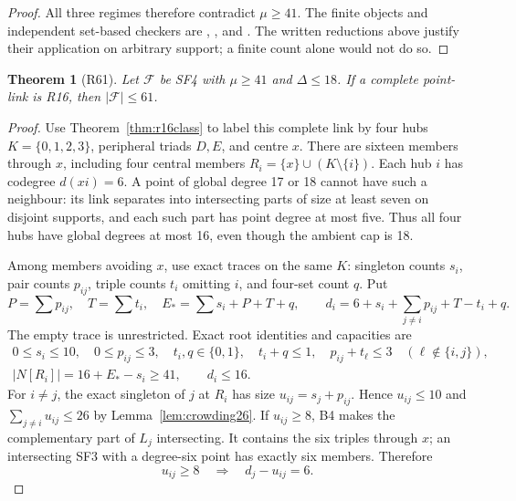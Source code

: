 \documentclass[11pt,a4paper]{article}
\numberwithin{equation}{section}
\newtheorem{theorem}{Theorem}[section]
\theoremstyle{remark}
\newcommand{\F}{\mathcal F}
\begin{document}
\begin{proof}
All three regimes therefore contradict $\mu\ge 41$. The finite
objects and independent set-based checkers are
,
,
 and
. The written reductions above
justify their application on arbitrary support; a finite count alone
would not do so.
\end{proof}

\begin{theorem}[R61]\label{thm:r61}
Let $\F $ be SF4 with $\mu\ge 41$ and $\Delta\le 18$. If a complete
point-link is R16, then $|\F|\le 61$.
\end{theorem}
\begin{proof}
Use Theorem~\ref{thm:r16class} to label this complete link by four hubs
$ K=\{0,1,2,3\}$, peripheral triads $ D,E $, and centre $ x $.
There are sixteen members through $ x $, including four central members
$ R_i=\{x\}\cup(K\setminus\{i\})$.
Each hub $ i $ has codegree $ d(xi)=6$. A point of global degree 17 or 18
cannot have such a neighbour: its link separates into intersecting
parts of size at least seven on disjoint supports, and each such
part has point degree at most five. Thus all four hubs have global
degrees at most 16, even though the ambient cap is 18.

Among members avoiding $ x $, use exact traces on the same $ K $: singleton
counts $ s_i $, pair counts $ p_{ij}$, triple counts $ t_i $ omitting $ i $, and
four-set count $ q $. Put
\[
 P=\sum p_{ij},\quad T=\sum t_i,\quad E_*=\sum s_i+P+T+q,
 \qquad d_i=6+s_i+\sum_{j\ne i}p_{ij}+T-t_i+q.
\]
The empty trace is unrestricted. Exact root identities and capacities
are
\begin{gather*}
 0\le s_i\le 10,\quad 0\le p_{ij}\le 3,\quad t_i,q\in\{0,1\},
 \quad t_i+q\le 1,\quad p_{ij}+t_\ell\le 3\quad(\ell\notin\{i,j\}),\\
 |N[R_i]|=16+E_*-s_i\ge 41,\qquad d_i\le 16.
\end{gather*}
For $ i\ne j $, the exact singleton of $ j $ at $ R_i $ has size
$ u_{ij}=s_j+p_{ij}$. Hence $ u_{ij}\le 10$ and
$\sum_{j\ne i}u_{ij}\le 26$ by Lemma~\ref{lem:crowding26}.
If $ u_{ij}\ge 8$, B4 makes the complementary part of $ L_j $
intersecting. It contains the six triples through $ x $; an intersecting
SF3 with a degree-six point has exactly six members. Therefore
\[
 u_{ij}\ge 8\quad\Longrightarrow\quad d_j-u_{ij}=6.
\]


\end{proof}
\end{document}
